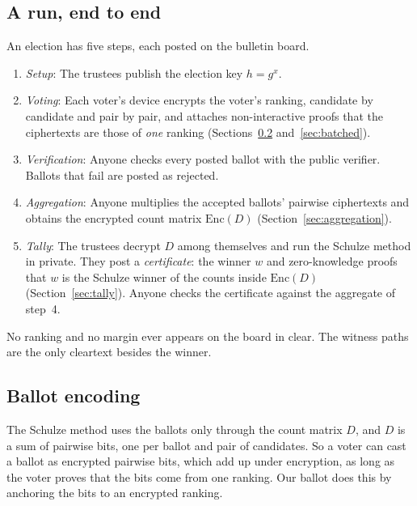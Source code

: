 \subsection{A run, end to end}\label{sec:run}
An election has five steps, each posted on the bulletin board.
\begin{enumerate}
  \item \emph{Setup}: The trustees publish the election key $h = g^x$.
  \item \emph{Voting}: Each voter's device encrypts the voter's ranking,
  candidate by candidate and pair by pair, and attaches non-interactive
  proofs that the ciphertexts are those of \emph{one} ranking
  (Sections~\ref{sec:ballot} and~\ref{sec:batched}).
  \item \emph{Verification}: Anyone checks every posted ballot with the
  public verifier. Ballots that fail are posted as rejected.
  \item \emph{Aggregation}: Anyone multiplies the accepted ballots'
  pairwise ciphertexts and obtains the encrypted count matrix
  $\mathrm{Enc}(D)$ (Section~\ref{sec:aggregation}).
  \item \emph{Tally}: The trustees decrypt $D$ among themselves and run
  the Schulze method in private. They post a \emph{certificate}: the
  winner $w$ and zero-knowledge proofs that $w$ is the Schulze winner of
  the counts inside $\mathrm{Enc}(D)$ (Section~\ref{sec:tally}). Anyone checks the certificate against the
  aggregate of step~4.
\end{enumerate}
No ranking and no margin ever appears on the board in clear. The witness paths are the only cleartext besides the winner.

\subsection{Ballot encoding}\label{sec:ballot}
The Schulze method uses the ballots only through the count matrix $D$,
and $D$ is a sum of pairwise bits, one per ballot and pair of
candidates. So a voter can cast a ballot as encrypted pairwise bits,
which add up under encryption, as long as the voter proves that the bits
come from one ranking. Our ballot does this by anchoring the bits to an
encrypted ranking.

